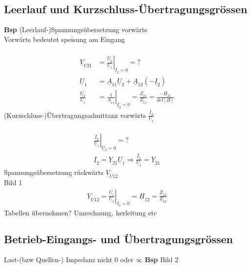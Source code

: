 \subsection{Leerlauf und Kurzschluss-Übertragungsgrössen}
\textbf{Bsp} (Leerlauf-)Spannungsübersetzung vorwärts\\
Vorwärts bedeutet speisung am Eingang\\
\\
\begin{align}
	\underline{V}_{U21}&=\left.\frac{\underline{U}_2}{\underline{U}_1}\right|_{\underline{I}_2=0}=?\nonumber\\
	\underline{U}_1&=\underline{A}_{11}\underline{U}_{2}+\underline{A}_{12}\left(-\underline{I}_2\right)\nonumber\\
	\frac{\underline{U}_2}{\underline{U}_1}&=\left.\frac{1}{\underline{A}_{11}}\right|_{\underline{I}_2=0}=\frac{\underline{Z}_{21}}{\underline{Z}_{11}}=\frac{-\underline{H}_{21}}{det[H]}\nonumber
\end{align}
(Kurzschluss-)Übertragungsadmittanz vorwärts
$\frac{\underline{I}_2}{\underline{U}_1}$\\
\\
\begin{align}
	\left.\frac{\underline{I}_2}{\underline{U}_1}\right|_{U_2=0}=?\nonumber\\
	\underline{I}_2=\underline{Y}_{21}\underline{U}_1\Rightarrow\frac{\underline{I}_2}{\underline{U}_1}=\underline{Y}_{21}\nonumber
\end{align}
Spannungsübersetzung rückwärts $\underline{V}_{U12}$\\
Bild 1\\
\begin{align}
	\underline{V}_{U12}=\left.\frac{\underline{U}_1}{\underline{U}_2}\right|_{I_1=0}=\underline{H}_{12}=\frac{\underline{Z}_{12}}{\underline{Z}_{22}}\nonumber
\end{align}
Tabellen übernehmen? Umrechnung, herleitung etc\\
\subsection{Betrieb-Eingangs- und Übertragungsgrössen}
Last-(bzw Quellen-) Impedanz nicht $0$ oder $\infty$
\textbf{Bsp} Bild 2\\

